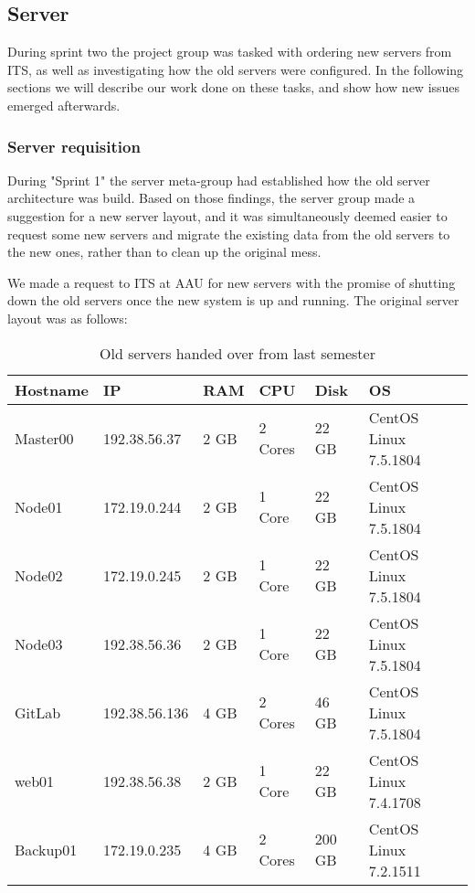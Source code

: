 \subsection{Server}\label{SEC:S2ServerWork}
During sprint two the project group was tasked with ordering new servers from ITS, as well as investigating how the old servers were configured.
In the following sections we will describe our work done on these tasks, and show how new issues emerged afterwards.

\subsubsection{Server requisition}
During "Sprint 1" the server meta-group had established how the old server architecture was build.
Based on those findings, the server group made a suggestion for a new server layout, and it was simultaneously deemed easier to request some new servers and migrate the existing data from the old servers to the new ones, rather than to clean up the original mess.

We made a request to ITS at AAU for new servers with the promise of shutting down the old servers once the new system is up and running. The original server layout was as follows:

\begin{table}[H]

\begin{tabular}{|l|l|l|l|l|l|}
\hline
Hostname 	& IP 			& RAM 	& CPU 		& Disk 		& OS 						\\ \hline
Master00 	& 192.38.56.37 	& 2 GB 	& 2 Cores 	& 22 GB 	& CentOS Linux 7.5.1804 	\\ \hline
Node01 		& 172.19.0.244 	& 2 GB 	& 1 Core 	& 22 GB 	& CentOS Linux 7.5.1804 	\\ \hline
Node02		& 172.19.0.245	& 2 GB	& 1 Core	& 22 GB		& CentOS Linux 7.5.1804		\\ \hline
Node03		& 192.38.56.36	& 2 GB	& 1 Core 	& 22 GB		& CentOS Linux 7.5.1804 	\\ \hline
GitLab 		& 192.38.56.136	& 4 GB	& 2 Cores 	& 46 GB 	& CentOS Linux 7.5.1804 	\\ \hline
web01		& 192.38.56.38	& 2 GB	& 1 Core	& 22 GB 	& CentOS Linux 7.4.1708 	\\ \hline
Backup01	& 172.19.0.235	& 4 GB	& 2 Cores	& 200 GB 	& CentOS Linux 7.2.1511 	\\ \hline
\end{tabular}
\caption{Old servers handed over from last semester}
\end{table}

